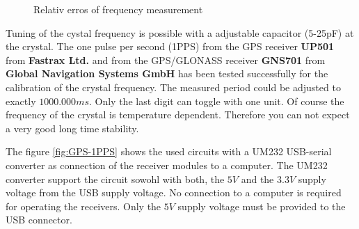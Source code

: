 \begin{figure}[H]
\centering

\caption{Relativ erros of frequency measurement}
\label{fig:freq-ppm}
\end{figure}

Tuning of the cystal frequency is possible with a adjustable capacitor (5-25pF) at the crystal.
The one pulse per second (1PPS) from the GPS receiver {\bf UP501} from {\bf Fastrax Ltd.} and from the GPS/GLONASS receiver
{\bf GNS701} from {\bf Global Navigation Systems GmbH} has been tested successfully for the calibration of the
crystal frequency.
The measured period could be adjusted to exactly \(1000.000ms\).
Only the last digit can toggle with one unit.
Of course the frequency of the crystal is temperature dependent.
Therefore you can not expect a very good long time stability.

The figure \ref{fig:GPS-1PPS} shows the used circuits with a UM232 USB-serial converter
as connection of the receiver modules to a computer.
The UM232 converter support the circuit sowohl with both, the \(5V\) and the \(3.3V\) supply voltage
from the USB supply voltage.
No connection to a computer is required for operating the receivers.
Only the \(5V\) supply voltage must be provided to the USB connector.

